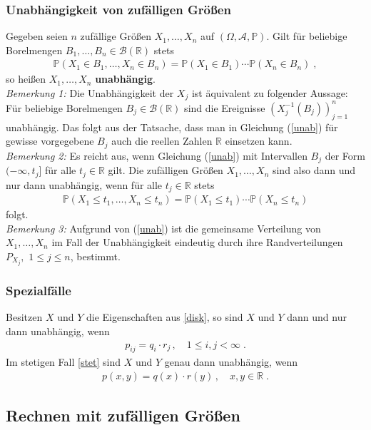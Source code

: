 \documentclass[ngerman,draft,parskip=half,twoside]{scrartcl}
\newcommand*{\R}{\mathbb{R}}      %
\newcommand*{\Algeb}{\mathcal{A}}   %
\newcommand*{\BorelM}{\mathcal{B}}  %
\newcommand*{\WKM}{\mathbb{P}}      %
\begin{document}
\subsubsection{Unabhängigkeit von zufälligen Größen}
Gegeben seien $n$ zufällige Größen $X_1,\ldots,X_n$ auf $(\Omega,\Algeb,\WKM)$. Gilt für beliebige
Borelmengen $B_1,\ldots,B_n\in\BorelM(\R)$ stets
\begin{gather}
\label{unab}
\WKM(X_1\in B_1,\ldots,X_n\in B_n)=\WKM(X_1\in B_1)\cdots\WKM(X_n\in B_n)\;,
\end{gather}
so heißen $X_1,\ldots,X_n$ \textbf{unabhängig}.\\
\textit{Bemerkung 1:} Die Unabhängigkeit der $X_j$ ist äquivalent zu folgender Aussage: Für
beliebige Borelmengen $B_j\in\BorelM(\R)$ sind die Ereignisse $\left(X_j^{-1}(B_j)\right)_{j=1}^n$
unabhängig. Das folgt aus der Tatsache, dass man in Gleichung (\ref{unab}) für gewisse vorgegebene $B_j$ auch die
reellen Zahlen $\R$ einsetzen kann.\\
\textit{Bemerkung 2:} Es reicht aus, wenn Gleichung (\ref{unab}) mit Intervallen $B_j$ der Form
$(-\infty,t_j]$ für alle $t_j\in\R$ gilt. Die zufälligen Größen $X_1,\ldots,X_n$ sind also
dann und nur dann unabhängig, wenn für alle $t_j\in\R$ stets
\begin{gather*}
  \WKM(X_1\le t_1,\ldots,X_n\le t_n)=\WKM(X_1\le t_1)\cdots\WKM(X_n\le t_n)
\end{gather*}
folgt.\\
\textit{Bemerkung 3:} Aufgrund von (\ref{unab}) ist die gemeinsame Verteilung von $X_1,\ldots,X_n$
im Fall der Unabhängigkeit eindeutig durch
ihre Randverteilungen $P_{X_j},$ $1\le j\le n$, bestimmt.
\subsubsection{Spezialfälle}
Besitzen $X$ und $Y$ die Eigenschaften aus \ref{disk}, so sind $X$ und $Y$ dann und nur  dann
unabhängig, wenn
\begin{gather*}
  p_{ij}=q_i\cdot r_j\,,\quad 1\le i,j<\infty\;.
\end{gather*}
Im stetigen Fall \ref{stet} sind $X$ und $Y$ genau dann unabhängig, wenn
\begin{gather*}
  p(x,y)=q(x)\cdot r(y)\,,\quad x,y\in\R\;.
\end{gather*}
\subsection{Rechnen mit zufälligen Größen}
\end{document}
